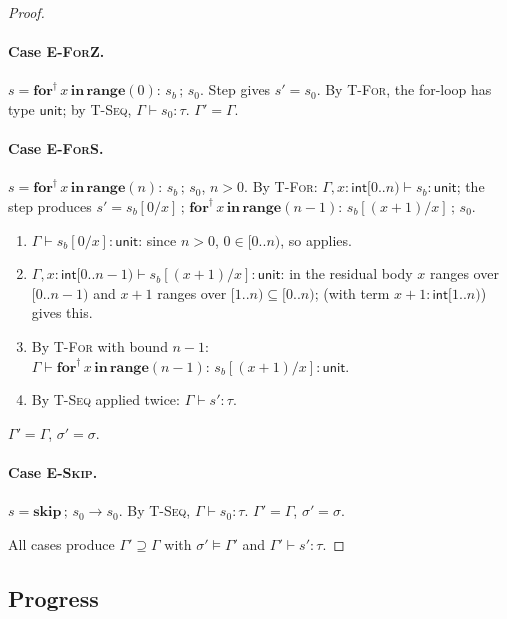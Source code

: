 \begin{proof}
\paragraph{Case \textsc{E-ForZ}.}
$s=\mathbf{for}^\dagger\,x\,\mathbf{in}\,\mathbf{range}(0):\,s_b\,;\,s_0$.
Step gives $s'=s_0$.
By \textsc{T-For}, the for-loop has type $\mathsf{unit}$; by \textsc{T-Seq},
$\Gamma\vdash s_0:\tau$. $\Gamma'=\Gamma$.

\paragraph{Case \textsc{E-ForS}.}
$s=\mathbf{for}^\dagger\,x\,\mathbf{in}\,\mathbf{range}(n):\,s_b\,;\,s_0$,
$n>0$.
By \textsc{T-For}: $\Gamma,x{:}\mathsf{int}[0..n)\vdash s_b:\mathsf{unit}$;
the step produces
$s'=s_b[0/x]\,;\,
 \mathbf{for}^\dagger\,x\,\mathbf{in}\,\mathbf{range}(n{-}1):\,
 s_b[(x{+}1)/x]\,;\,s_0$.
\begin{enumerate}
\item $\Gamma\vdash s_b[0/x]:\mathsf{unit}$:
 since $n>0$, $0\in[0..n)$, so  applies.
\item $\Gamma,x{:}\mathsf{int}[0..n{-}1)\vdash s_b[(x{+}1)/x]:\mathsf{unit}$:
 in the residual body $x$ ranges over $[0..n{-}1)$ and $x{+}1$ ranges over
 $[1..n)\subseteq[0..n)$;  (with term
 $x{+}1:\mathsf{int}[1..n)$) gives this.
\item By \textsc{T-For} with bound $n{-}1$:
 $\Gamma\vdash
 \mathbf{for}^\dagger\,x\,\mathbf{in}\,\mathbf{range}(n{-}1):\,
 s_b[(x{+}1)/x]:\mathsf{unit}$.
\item By \textsc{T-Seq} applied twice: $\Gamma\vdash s':\tau$.
\end{enumerate}
$\Gamma'=\Gamma$, $\sigma'=\sigma$.

\paragraph{Case \textsc{E-Skip}.}
$s=\mathbf{skip}\,;\,s_0\to s_0$.
By \textsc{T-Seq}, $\Gamma\vdash s_0:\tau$.
$\Gamma'=\Gamma$, $\sigma'=\sigma$.

\smallskip
All cases produce $\Gamma'\supseteq\Gamma$ with
$\sigma'\models\Gamma'$ and $\Gamma'\vdash s':\tau$.
\end{proof}

\subsection{Progress}

